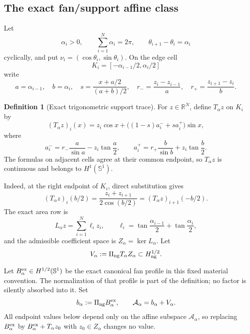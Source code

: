 \documentclass[11pt]{amsart}
\numberwithin{equation}{section}
\theoremstyle{definition}
\newtheorem{definition}[theorem]{Definition}
\theoremstyle{remark}
\newcommand{\Sone}{\mathbb S^1}
\newcommand{\R}{\mathbb R}
\newcommand{\PiNG}{\Pi_{\rm ng}}
\begin{document}
\subsection{The exact fan/support affine class}

Let
\begin{equation}
 \alpha_i>0,\qquad \sum_{i=1}^N\alpha_i=2\pi,
 \qquad \theta_{i+1}-\theta_i=\alpha_i
\end{equation}
cyclically, and put $\nu_i=(\cos\theta_i,\sin\theta_i)$.  On the edge cell
\begin{equation}
 K_i=[-\alpha_{i-1}/2,\alpha_i/2]
\end{equation}
write
\begin{equation}
 a=\alpha_{i-1},\quad b=\alpha_i,\quad
 s=\frac{x+a/2}{(a+b)/2},\quad
 r_- =\frac{z_i-z_{i-1}}a,\quad
 r_+=\frac{z_{i+1}-z_i}b.
\end{equation}

\begin{definition}[Exact trigonometric support trace]\label{F51:def:T}
For $z\in\R^N$, define $T_\alpha z$ on $K_i$ by
\begin{equation}\label{F51:eq:T}
 (T_\alpha z)_i(x)
 =z_i\cos x+\bigl((1-s)a_i^-+sa_i^+\bigr)\sin x,
\end{equation}
where
\begin{equation}\label{F51:eq:apm}
 a_i^-=r_-\frac a{\sin a}-z_i\tan\frac a2,
 \qquad
 a_i^+=r_+\frac b{\sin b}+z_i\tan\frac b2.
\end{equation}
The formulas on adjacent cells agree at their common endpoint, so
$T_\alpha z$ is continuous and belongs to $H^1(\Sone)$.
\end{definition}

Indeed, at the right endpoint of $K_i$, direct substitution gives
\begin{equation}
 (T_\alpha z)_i(b/2)
 =\frac{z_i+z_{i+1}}{2\cos(b/2)}
 =(T_\alpha z)_{i+1}(-b/2).
\end{equation}
The exact area row is
\begin{equation}\label{F51:eq:area-row}
 L_\alpha z=\sum_{i=1}^N\ell_i z_i,
 \qquad
 \ell_i=\tan\frac{\alpha_{i-1}}2+\tan\frac{\alpha_i}2,
\end{equation}
and the admissible coefficient space is $Z_\alpha=\ker L_\alpha$.  Let
\begin{equation}\label{F51:eq:V}
 V_\alpha:=\PiNG T_\alpha Z_\alpha\subset H_{\rm ng}^{1/2}.
\end{equation}

Let $B_\alpha^{\rm ex}\in H^{1/2}(\Sone)$ be the exact canonical fan
profile in this fixed material convention.  The normalization of that
profile is part of the definition; no factor is silently absorbed into it.
Set
\begin{equation}\label{F51:eq:b}
 b_\alpha:=\PiNG B_\alpha^{\rm ex},
 \qquad
 \mathcal A_\alpha=b_\alpha+V_\alpha.
\end{equation}
All endpoint values below depend only on the affine subspace
$\mathcal A_\alpha$, so replacing $B_\alpha^{\rm ex}$ by
$B_\alpha^{\rm ex}+T_\alpha z_0$ with $z_0\in Z_\alpha$ changes no value.
\end{document}
